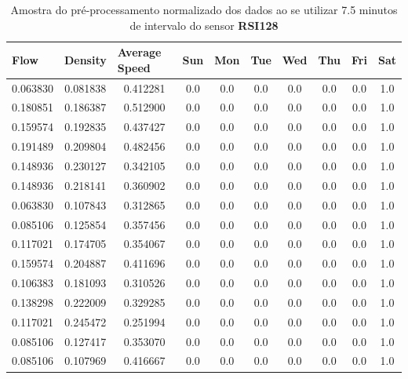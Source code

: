 \begin{table}[htbp]
    \begin{tabular}{cccccccccc}
    \toprule
    \multicolumn{1}{l}{\textbf{Flow}} & \multicolumn{1}{l}{\textbf{Density}} & \multicolumn{1}{l}{\textbf{Average Speed}} & \multicolumn{1}{l}{\textbf{Sun}} &
    \multicolumn{1}{l}{\textbf{Mon}} & \multicolumn{1}{l}{\textbf{Tue}} & \multicolumn{1}{l}{\textbf{Wed}} & \multicolumn{1}{l}{\textbf{Thu}} &
    \multicolumn{1}{l}{\textbf{Fri}} &
    \multicolumn{1}{l}{\textbf{Sat}} \\
    \midrule
    0.063830 & 0.081838 & 0.412281 & 0.0 & 0.0 & 0.0 & 0.0 & 0.0 & 0.0 & 1.0 
    \\
    \midrule
    0.180851 & 0.186387 & 0.512900 & 0.0 & 0.0 & 0.0 & 0.0 & 0.0 & 0.0 & 1.0 
    \\
    \midrule
    0.159574 & 0.192835 & 0.437427 & 0.0 & 0.0 & 0.0 & 0.0 & 0.0 & 0.0 & 1.0 
    \\
    \midrule
    0.191489 & 0.209804 & 0.482456 & 0.0 & 0.0 & 0.0 & 0.0 & 0.0 & 0.0 & 1.0 
    \\
    \midrule
    0.148936 & 0.230127 & 0.342105 & 0.0 & 0.0 & 0.0 & 0.0 & 0.0 & 0.0 & 1.0 
    \\
    \midrule
    0.148936 & 0.218141 & 0.360902 & 0.0 & 0.0 & 0.0 & 0.0 & 0.0 & 0.0 & 1.0 
    \\
    \midrule
    0.063830 & 0.107843 & 0.312865 & 0.0 & 0.0 & 0.0 & 0.0 & 0.0 & 0.0 & 1.0 
    \\
    \midrule
    0.085106 & 0.125854 & 0.357456 & 0.0 & 0.0 & 0.0 & 0.0 & 0.0 & 0.0 & 1.0 
    \\
    \midrule
    0.117021 & 0.174705 & 0.354067 & 0.0 & 0.0 & 0.0 & 0.0 & 0.0 & 0.0 & 1.0 
    \\
    \midrule
    0.159574 & 0.204887 & 0.411696 & 0.0 & 0.0 & 0.0 & 0.0 & 0.0 & 0.0 & 1.0 
    \\
    \midrule
    0.106383 & 0.181093 & 0.310526 & 0.0 & 0.0 & 0.0 & 0.0 & 0.0 & 0.0 & 1.0 
    \\
    \midrule
    0.138298 & 0.222009 & 0.329285 & 0.0 & 0.0 & 0.0 & 0.0 & 0.0 & 0.0 & 1.0 
    \\
    \midrule
    0.117021 & 0.245472 & 0.251994 & 0.0 & 0.0 & 0.0 & 0.0 & 0.0 & 0.0 & 1.0 
    \\
    \midrule
    0.085106 & 0.127417 & 0.353070 & 0.0 & 0.0 & 0.0 & 0.0 & 0.0 & 0.0 & 1.0 
    \\
    \midrule
    0.085106 & 0.107969 & 0.416667 & 0.0 & 0.0 & 0.0 & 0.0 & 0.0 & 0.0 & 1.0 
    \\
    \bottomrule
    \end{tabular}
    \label{table:data_pre_norm}
    \caption{Amostra do pré-processamento normalizado dos dados ao se utilizar 7.5 minutos de intervalo do sensor \textbf{RSI128}}
\end{table}


